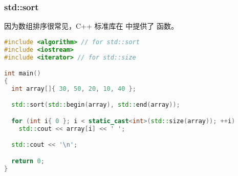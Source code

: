 \documentclass[../../LearnCpp.tex]{subfiles}
\begin{document}
\subsubsection*{std::sort}

因为数组排序很常见，C++ 标准库在  中提供了  函数。

\begin{lstlisting}[language=C++]
#include <algorithm> // for std::sort
#include <iostream>
#include <iterator> // for std::size

int main()
{
  int array[]{ 30, 50, 20, 10, 40 };

  std::sort(std::begin(array), std::end(array));

  for (int i{ 0 }; i < static_cast<int>(std::size(array)); ++i)
    std::cout << array[i] << ' ';

  std::cout << '\n';

  return 0;
}
\end{lstlisting}
\end{document}
